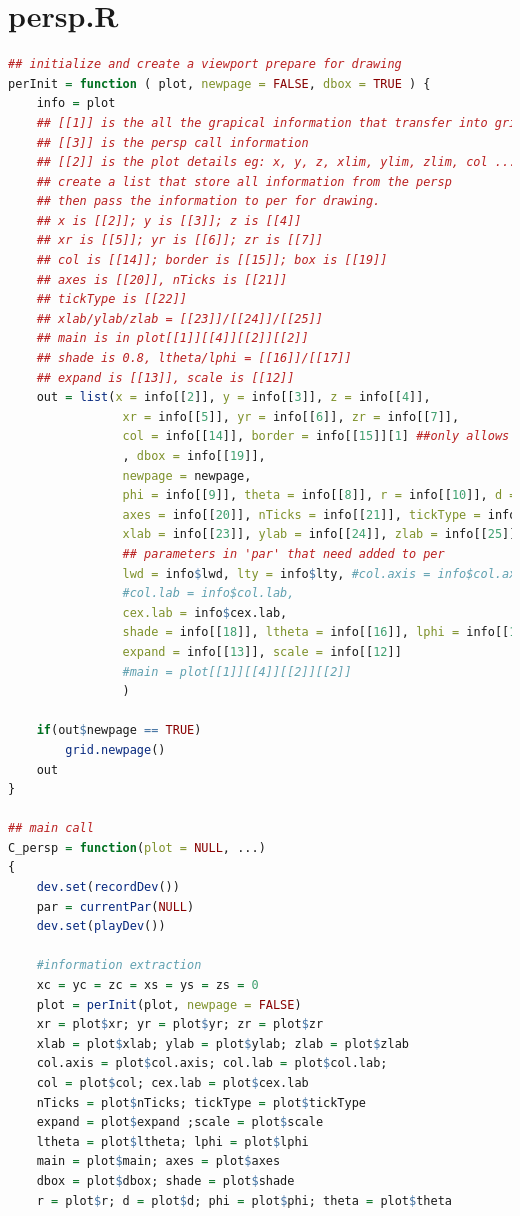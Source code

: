 \documentclass{report}
\begin{document}
\section{persp.R}
\begin{lstlisting}[language = R]
## initialize and create a viewport prepare for drawing
perInit = function ( plot, newpage = FALSE, dbox = TRUE ) {
    info = plot
    ## [[1]] is the all the grapical information that transfer into grid
    ## [[3]] is the persp call information
    ## [[2]] is the plot details eg: x, y, z, xlim, ylim, zlim, col ...
    ## create a list that store all information from the persp
    ## then pass the information to per for drawing.
    ## x is [[2]]; y is [[3]]; z is [[4]]
    ## xr is [[5]]; yr is [[6]]; zr is [[7]]
    ## col is [[14]]; border is [[15]]; box is [[19]]
    ## axes is [[20]], nTicks is [[21]]
    ## tickType is [[22]]
    ## xlab/ylab/zlab = [[23]]/[[24]]/[[25]]
	## main is in plot[[1]][[4]][[2]][[2]]
    ## shade is 0.8, ltheta/lphi = [[16]]/[[17]]
    ## expand is [[13]], scale is [[12]]
    out = list(x = info[[2]], y = info[[3]], z = info[[4]],
                xr = info[[5]], yr = info[[6]], zr = info[[7]],
                col = info[[14]], border = info[[15]][1] ##only allows one color for border
				, dbox = info[[19]],
                newpage = newpage, 
                phi = info[[9]], theta = info[[8]], r = info[[10]], d = info[[11]],
                axes = info[[20]], nTicks = info[[21]], tickType = info[[22]],
                xlab = info[[23]], ylab = info[[24]], zlab = info[[25]],
				## parameters in 'par' that need added to per
                lwd = info$lwd, lty = info$lty, #col.axis = info$col.axis,
				#col.lab = info$col.lab, 
				cex.lab = info$cex.lab, 
                shade = info[[18]], ltheta = info[[16]], lphi = info[[17]],
                expand = info[[13]], scale = info[[12]]
				#main = plot[[1]][[4]][[2]][[2]]
                )
    
    if(out$newpage == TRUE)
        grid.newpage()
    out
}

## main call 
C_persp = function(plot = NULL, ...)
{
    dev.set(recordDev())
    par = currentPar(NULL)
    dev.set(playDev())
    
    #information extraction
    xc = yc = zc = xs = ys = zs = 0
    plot = perInit(plot, newpage = FALSE)
    xr = plot$xr; yr = plot$yr; zr = plot$zr
    xlab = plot$xlab; ylab = plot$ylab; zlab = plot$zlab
    col.axis = plot$col.axis; col.lab = plot$col.lab; 
    col = plot$col; cex.lab = plot$cex.lab
    nTicks = plot$nTicks; tickType = plot$tickType
    expand = plot$expand ;scale = plot$scale
    ltheta = plot$ltheta; lphi = plot$lphi
    main = plot$main; axes = plot$axes
    dbox = plot$dbox; shade = plot$shade
    r = plot$r; d = plot$d; phi = plot$phi; theta = plot$theta
	

\end{lstlisting}
\end{document}
